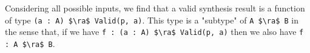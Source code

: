 \documentclass[10pt]{article}
\begin{document}
\noindent
Considering all possible inputs, we find that a valid synthesis result is a function of type \lstinline{(a : A) $\ra$ Valid(p, a)}. This type is
a "subtype" of \lstinline{A $\ra$ B} in the sense that, if we have \lstinline{f : (a : A) $\ra$ Valid(p, a)} then we also have \lstinline{f : A $\ra$ B}.



%
\end{document}
